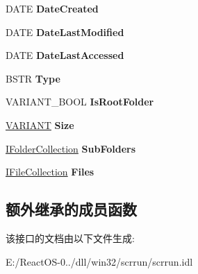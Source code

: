 \begin{DoxyCompactItemize}
\item 
\mbox{\label{interface_scripting_1_1_i_folder_a0205ed337488b01c244f28c167f81ae5}} 
D\+A\+TE {\bfseries Date\+Created}
\item 
\mbox{\label{interface_scripting_1_1_i_folder_a88f1bbcb257c2a1ddd7bc4b1511cfd51}} 
D\+A\+TE {\bfseries Date\+Last\+Modified}
\item 
\mbox{\label{interface_scripting_1_1_i_folder_a483161824fbc07329c9d05a641732546}} 
D\+A\+TE {\bfseries Date\+Last\+Accessed}
\item 
\mbox{\label{interface_scripting_1_1_i_folder_ab19f4f5eb4edd95661aa06d19d3c3c77}} 
B\+S\+TR {\bfseries Type}
\item 
\mbox{\label{interface_scripting_1_1_i_folder_a12afcc0c239c0f38c4bb4f2e334f02c0}} 
V\+A\+R\+I\+A\+N\+T\+\_\+\+B\+O\+OL {\bfseries Is\+Root\+Folder}
\item 
\mbox{\label{interface_scripting_1_1_i_folder_a8993887a542501e2041e6207c92e95ff}} 
\hyperlink{structtag_v_a_r_i_a_n_t}{V\+A\+R\+I\+A\+NT} {\bfseries Size}
\item 
\mbox{\label{interface_scripting_1_1_i_folder_a517ae76cac1a4131f52ba555e6d922c8}} 
\hyperlink{interface_scripting_1_1_i_folder_collection}{I\+Folder\+Collection} {\bfseries Sub\+Folders}
\item 
\mbox{\label{interface_scripting_1_1_i_folder_a2828608d3701253d7fd0045544a9642f}} 
\hyperlink{interface_scripting_1_1_i_file_collection}{I\+File\+Collection} {\bfseries Files}
\end{DoxyCompactItemize}
\subsection*{额外继承的成员函数}


该接口的文档由以下文件生成\+:\begin{DoxyCompactItemize}
\item 
E\+:/\+React\+O\+S-\/0../dll/win32/scrrun/scrrun.\+idl\end{DoxyCompactItemize}
